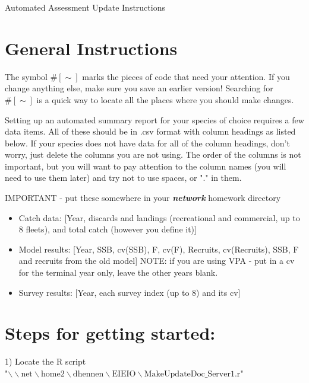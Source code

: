 \documentclass[]{report}
\begin{document}
\begin{center}
\huge{Automated Assessment Update Instructions}
\end{center}

\normalsize
\section*{General Instructions}
The symbol $\#[\sim]$ marks the pieces of code that need your attention.  If you change anything else, make sure you save an earlier version!  Searching for $\#[\sim]$ is a quick way to locate all the places where you should make changes.

Setting up an automated summary report for your species of choice requires a few data items.  All of these should be in .csv format with column headings as listed below.  If your species does not have data for all of the column headings, don't worry, just delete the columns you are not using.  The order of the columns is not important, but you will want to pay attention to the column names (you will need to use them later) and try not to use spaces, or "." in them.

IMPORTANT - put these somewhere in your \textbf{\textit{\large{network}}} homework directory

\begin{itemize}

 \item Catch data: [Year, discards and landings (recreational and commercial, up to 8 fleets), and total catch (however you define it)]

\item Model results: [Year, SSB, cv(SSB), F, cv(F), Recruits, cv(Recruits), SSB, F and recruits from the old model] NOTE: if you are using VPA - put in a cv for the terminal year only, leave the other years blank.

\item Survey results: [Year, each survey index (up to 8) and its cv]

\end{itemize}

\section*{Steps for getting started:} 

\normalsize
1) Locate the R script \\ "$\backslash{}\backslash{}\text{net}\backslash{}\text{home2}\backslash{}\text{dhennen}
\backslash{}\text{EIEIO}\backslash{}\text{MakeUpdateDoc\_Server1.r}$"\\
\end{document}
